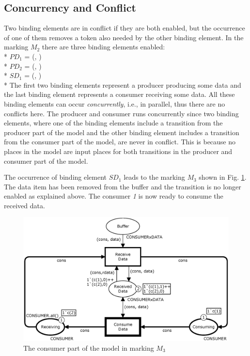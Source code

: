 \subsection{Concurrency and Conflict}
Two binding elements are in conflict if they are both enabled, but the occurrence of one of them removes a token also needed by the other binding element. In the marking $M_2$ there are three binding elements enabled: \\*
\newline
$PD_1$ = (, )\\*
$PD_2$ = (, )\\*
$SD_1$ = (, )\\*
\newline
The first two binding elements represent a producer producing some data and the last binding element represents a consumer receiving some data. All these binding elements can occur \emph{concurrently}, i.e., in parallel, thus there are no conflicts here. The producer and consumer runs concurrently since two binding elements, where one of the binding elements include a transition from the producer part of the model and the other binding element includes a transition from the consumer part of the model, are never in conflict. This is because no places in the model are input places for both transitions in the producer and consumer part of the model. 

The occurrence of binding element $SD_1$ leads to the marking $M_3$ shown in Fig. \ref{fig:systemmoduleConsumerM3}. The data item has been removed from the buffer and the transition  is no longer enabled as explained above. The consumer \emph{1} is now ready to consume the received data.

\begin{figure}[b!]
\centering
\includegraphics[scale=0.4]{background/graphics/SystemConsumerM3.eps}
\caption{The consumer part of the model in marking $M_3$}
\label{fig:systemmoduleConsumerM3}
\end{figure}


